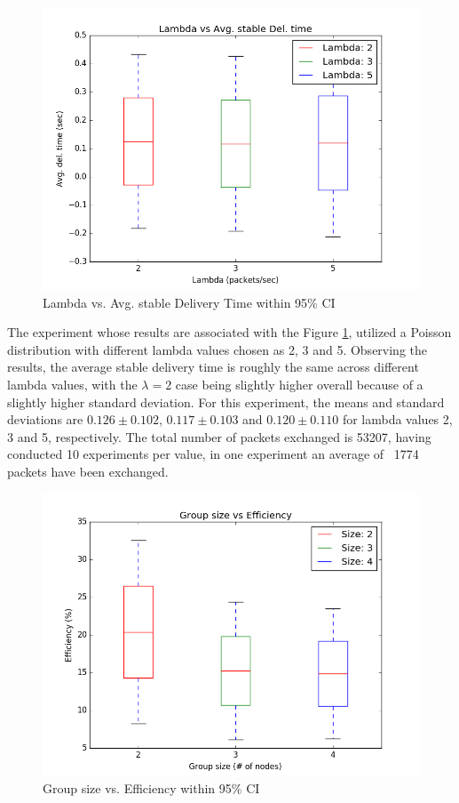 \documentclass[a4paper, 12pt]{article}
\begin{document}
\begin{figure}[h]
\centering
   \includegraphics[scale=0.45]{Lambda_vs_AvgDT_Final.png}
   \caption{Lambda vs. Avg. stable Delivery Time within 95\% CI}
   \label{lbvsavg}
\end{figure}

The experiment whose results are associated with the Figure \ref{lbvsavg}, utilized a Poisson distribution with different lambda values chosen as 2, 3 and 5. Observing the results, the average stable delivery time is roughly the same across different lambda values, with the $\lambda = 2$ case being slightly higher overall because of a slightly higher standard deviation. For this experiment, the means and standard deviations are $0.126 \pm 0.102$, $0.117 \pm 0.103$ and $0.120 \pm 0.110$ for lambda values 2, 3 and 5, respectively. The total number of packets exchanged is 53207, having conducted 10 experiments per value, in one experiment an average of ~1774 packets have been exchanged.

\begin{figure}[h]
\centering
   \includegraphics[scale=0.45]{GS_vs_Eff_Real.png}
   \caption{Group size vs. Efficiency within 95\% CI}
   \label{gsvseff}
\end{figure}
\end{document}
